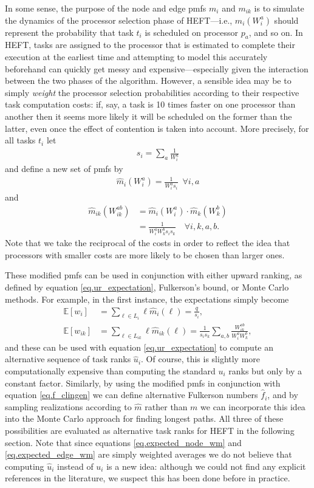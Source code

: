 \documentclass[12pt]{article}
\def\E{\mathbb{E}}
\begin{document}
In some sense, the purpose of the node and edge pmfs $m_i$ and $m_{ik}$ is to simulate the dynamics of the processor selection phase of HEFT---i.e., $m_i(W_i^a)$ should represent the probability that task $t_i$ is scheduled on processor $p_a$, and so on. In HEFT, tasks are assigned to the processor that is estimated to complete their execution at the earliest time and attempting to model this accurately beforehand can quickly get messy and expensive---especially given the interaction between the two phases of the algorithm. However, a sensible idea may be to simply {\em weight} the processor selection probabilities according to their respective task computation costs: if, say, a task is 10 times faster on one processor than another then it seems more likely it will be scheduled on the former than the latter, even once the effect of contention is taken into account. More precisely, for all tasks $t_i$ let 
\begin{align*}
s_i = \sum_{a} \frac{1}{W_i^a}
\end{align*} 
and define a new set of pmfs by
\begin{align*}
\hat{m}_i(W_i^a) = \frac{1}{W_i^as_i} \enspace \forall i, a
\end{align*}
and 
\begin{align*}
\hat{m}_{ik}(W_{ik}^{ab}) &= \hat{m}_i(W_i^a) \cdot \hat{m}_k(W_k^b) \\
&= \frac{1}{W_i^aW_k^bs_is_k} \quad \forall i, k, a, b.
\end{align*}
Note that we take the reciprocal of the costs in order to reflect the idea that processors with smaller costs are more likely to be chosen than larger ones.

These modified pmfs can be used in conjunction with either upward ranking, as defined by equation \eqref{eq.ur_expectation}, Fulkerson's bound, or Monte Carlo methods. For example, in the first instance, the expectations simply become 
\begin{align}
\E[w_i] &= \sum_{\ell \in L_i} \ell \hat{m}_i(\ell) = \frac{q}{s_i}, \label{eq.expected_node_wm}\\
\E[w_{ik}] &= \sum_{\ell \in L_{ik}} \ell \hat{m}_{ik}(\ell) = \frac{1}{s_i s_k} \sum_{a, b} \frac{W_{ik}^{ab}}{W_i^a W_k^b} \label{eq.expected_edge_wm},
\end{align}
and these can be used with equation \eqref{eq.ur_expectation} to compute an alternative sequence of task ranks $\hat{u}_i$. Of course, this is slightly more computationally expensive than computing the standard $u_i$ ranks but only by a constant factor. Similarly, by using the modified pmfs in conjunction with equation \eqref{eq.f_clingen} we can define alternative Fulkerson numbers $\hat{f}_i$, and by sampling realizations according to $\hat{m}$ rather than $m$ we can incorporate this idea into the Monte Carlo approach for finding longest paths. All three of these possibilities are evaluated as alternative task ranks for HEFT in the following section. Note that since equations \eqref{eq.expected_node_wm} and \eqref{eq.expected_edge_wm} are simply weighted averages we do not believe that computing $\hat{u}_i$ instead of $u_i$ is a new idea: although we could not find any explicit references in the literature, we suspect this has been done before in practice.  
\end{document}
